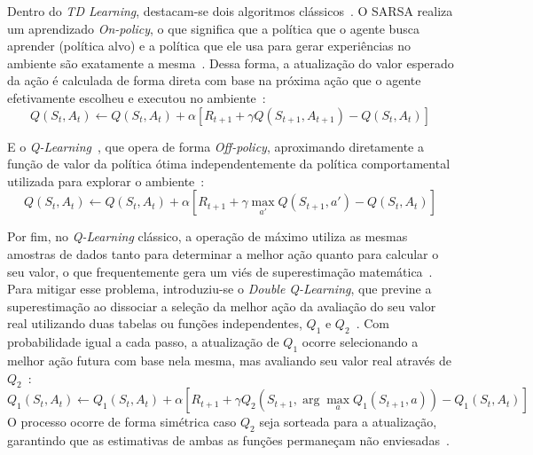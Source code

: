 
Dentro do \textit{TD Learning}, destacam-se dois algoritmos clássicos~\cite{sutton2018}. O \gls{SARSA} realiza um aprendizado \textit{On-policy}, o que significa que a política que o agente busca aprender (política alvo) e a política que ele usa para gerar experiências no ambiente são exatamente a mesma~\cite{hu2024, sutton2018}. Dessa forma, a atualização do valor esperado da ação é calculada de forma direta com base na próxima ação que o agente efetivamente escolheu e executou no ambiente~\cite{sutton2018}:
\begin{equation}
    Q(S_t, A_t) \leftarrow Q(S_t, A_t) + \alpha \left[ R_{t+1} + \gamma Q(S_{t+1}, A_{t+1}) - Q(S_t, A_t) \right]
\end{equation}

E o \textit{\textit{Q-Learning}}~\cite{watkins1992}, que opera de forma \textit{Off-policy}, aproximando diretamente a função de valor da política ótima independentemente da política comportamental utilizada para explorar o ambiente~\cite{hu2024, sutton2018}:
\begin{equation}
    Q(S_t, A_t) \leftarrow Q(S_t, A_t) + \alpha \left[ R_{t+1} + \gamma \max_{a'} Q(S_{t+1}, a') - Q(S_t, A_t) \right]
\end{equation}

Por fim, no \textit{\textit{Q-Learning}} clássico, a operação de máximo utiliza as mesmas amostras de dados tanto para determinar a melhor ação quanto para calcular o seu valor, o que frequentemente gera um viés de superestimação matemática~\cite{sutton2018, hu2024}. Para mitigar esse problema, introduziu-se o \textit{Double Q-Learning}, que previne a superestimação ao dissociar a seleção da melhor ação da avaliação do seu valor real utilizando duas tabelas ou funções independentes, $Q_1$ e $Q_2$~\cite{hasselt2010double, hu2024}. Com probabilidade igual a cada passo, a atualização de $Q_1$ ocorre selecionando a melhor ação futura com base nela mesma, mas avaliando seu valor real através de $Q_2$~\cite{sutton2018}:
\begin{equation}
    Q_1(S_t, A_t) \leftarrow Q_1(S_t, A_t) + \alpha \left[ R_{t+1} + \gamma Q_2(S_{t+1}, \arg\max_{a} Q_1(S_{t+1}, a)) - Q_1(S_t, A_t) \right]
\end{equation}
O processo ocorre de forma simétrica caso $Q_2$ seja sorteada para a atualização, garantindo que as estimativas de ambas as funções permaneçam não enviesadas~\cite{sutton2018}.


